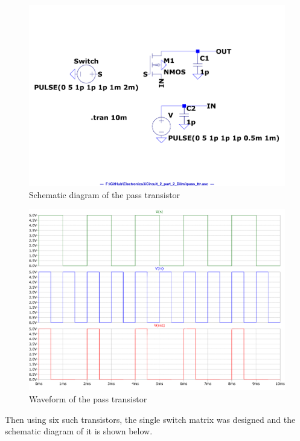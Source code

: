 \documentclass[a4paper,11pt]{article}%
\begin{document}
\begin{figure}[H]
	\centering
	\includegraphics[scale=0.4]{figures/2part2/pass_ttr.pdf}
	\caption{Schematic diagram of the pass transistor}
\end{figure}
\begin{figure}[H]
	\centering
	\includegraphics[scale=0.5]{figures/2part2/pass_wave.pdf}
	\caption{Waveform of the pass transistor}
\end{figure}

Then using six such transistors, the single switch matrix was designed and the schematic diagram of it is shown below.
\end{document}
